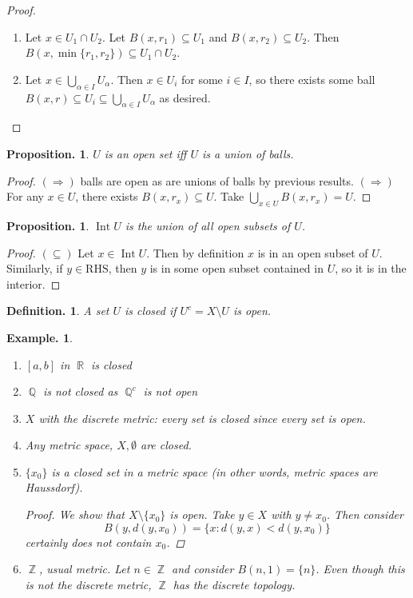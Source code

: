 \documentclass[11pt, a4paper]{memoir}
\DeclareMathOperator{\Q}{{\mathbb{Q}}}
\DeclareMathOperator{\Z}{{\mathbb{Z}}}
\DeclareMathOperator{\R}{{\mathbb{R}}}
\theoremstyle{change}
\newtheorem{proposition}[theorem]{Proposition.}
\theoremstyle{plain}
\theoremstyle{nonumberplain}
\newtheorem{definition}{Definition.}
\newtheorem{example}{Example.}
\newtheorem{proof}{Proof}
\DeclareMathOperator{\Int}{Int}
\numberwithin{equation}{section}
\begin{document}
\begin{proof}
    \begin{enumerate}
        \item Let $x\in U_1\cap U_2$. Let $B(x,r_1)\subseteq U_1$ and $B(x,r_2)\subseteq U_2$. Then $B(x,\min\{r_1,r_2\})\subseteq U_1\cap U_2$.
        \item Let $x\in\bigcup_{\alpha\in I}U_\alpha$. Then $x\in U_i$ for some $i\in I$, so there exists some ball
            $B(x,r)\subseteq U_i\subseteq\bigcup_{\alpha\in I}U_\alpha$ as desired.
    \end{enumerate}
\end{proof}
\begin{proposition}
    $U$ is an open set iff $U$ is a union of balls.
\end{proposition}
\begin{proof}
    $(\Rightarrow)$ balls are open as are unions of balls by previous results.
    $(\Rightarrow)$ For any $x\in U$, there exists $B(x,r_x)\subseteq U$. Take $\bigcup_{x\in U}B(x,r_x)=U$.
\end{proof}
\begin{proposition}
    $\Int U$ is the union of all open subsets of $U$.
\end{proposition}
\begin{proof}
    $(\subseteq)$ Let $x\in\Int U$. Then by definition $x$ is in an open subset of $U$. Similarly, if $y\in\text{RHS}$,
    then $y$ is in some open subset contained in $U$, so it is in the interior.
\end{proof}
\begin{definition}
    A set $U$ is closed if $U^c=X\setminus U$ is open.
\end{definition}
\begin{example}
    \begin{enumerate}
        \item $[a,b]$ in $\R$ is closed
        \item $\Q$ is not closed as $\Q^c$ is not open
        \item $X$ with the discrete metric: every set is closed since every set is open.
        \item Any metric space, $X,\emptyset$ are closed.
        \item $\{x_0\}$ is a closed set in a metric space (in other words, metric spaces are Haussdorf).
            \begin{proof}
                We show that $X\setminus\{x_0\}$ is open. Take $y\in X$ with $y\neq x_0$. Then consider
                \[B(y,d(y,x_0))=\{x:d(y,x)<d(y,x_0)\}\]
                certainly does not contain $x_0$.
            \end{proof}
        \item $\Z$, usual metric. Let $n\in\Z$ and consider $B(n,1)=\{n\}$. Even though this is not the discrete metric,
            $\Z$ has the discrete topology.
    \end{enumerate}
\end{example}
\end{document}
